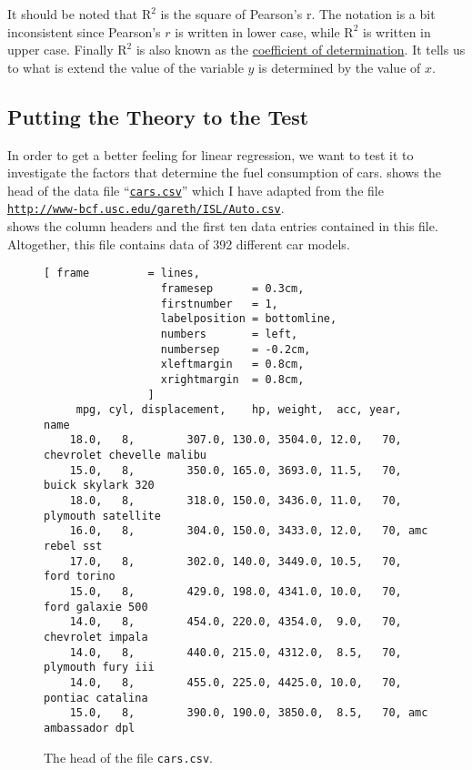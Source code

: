It should be noted that $\mathrm{R}^2$ is the square of Pearson's \textrm{r}.  The notation is a bit
inconsistent since Pearson's $r$ is written in lower case, while $\mathrm{R}^2$ is written in upper
case.  Finally $\mathrm{R}^2$ is also known as the 
\href{https://en.wikipedia.org/wiki/Coefficient_of_determination}{coefficient of determination}.  It tells us
to what is extend the value of the variable $y$ is determined by the value of $x$.


\subsection{Putting the Theory to the Test}
In order to get a better feeling for linear regression, we want to test it to investigate the factors that
determine the fuel consumption of cars.   shows the head of the data file 
``\href{https://github.com/karlstroetmann/Artificial-Intelligence/blob/master/SetlX/cars.csv}{\texttt{cars.csv}}''
which I have adapted from the file
\\[0.2cm]
\hspace*{1.3cm}
\href{http://www-bcf.usc.edu/~gareth/ISL/Auto.csv}{\texttt{http://www-bcf.usc.edu/gareth/ISL/Auto.csv}}.
\\[0.2cm]
 shows the column headers and the first ten data entries contained in this file.  
Altogether, this file contains data of 392 different car models.

\begin{figure}[!ht]
\centering
\begin{Verbatim}[ frame         = lines, 
                  framesep      = 0.3cm, 
                  firstnumber   = 1,
                  labelposition = bottomline,
                  numbers       = left,
                  numbersep     = -0.2cm,
                  xleftmargin   = 0.8cm,
                  xrightmargin  = 0.8cm,
                ]
     mpg, cyl, displacement,    hp, weight,  acc, year, name
    18.0,   8,        307.0, 130.0, 3504.0, 12.0,   70, chevrolet chevelle malibu
    15.0,   8,        350.0, 165.0, 3693.0, 11.5,   70, buick skylark 320
    18.0,   8,        318.0, 150.0, 3436.0, 11.0,   70, plymouth satellite
    16.0,   8,        304.0, 150.0, 3433.0, 12.0,   70, amc rebel sst
    17.0,   8,        302.0, 140.0, 3449.0, 10.5,   70, ford torino
    15.0,   8,        429.0, 198.0, 4341.0, 10.0,   70, ford galaxie 500
    14.0,   8,        454.0, 220.0, 4354.0,  9.0,   70, chevrolet impala
    14.0,   8,        440.0, 215.0, 4312.0,  8.5,   70, plymouth fury iii
    14.0,   8,        455.0, 225.0, 4425.0, 10.0,   70, pontiac catalina
    15.0,   8,        390.0, 190.0, 3850.0,  8.5,   70, amc ambassador dpl
\end{Verbatim}
\vspace*{-0.3cm}
\caption{The head of the file \texttt{cars.csv}.}
\label{fig:cars.csv}
\end{figure}

